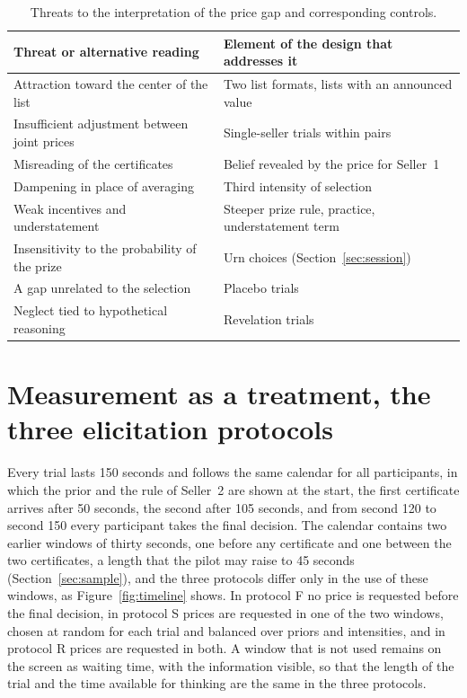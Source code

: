 \documentclass[11pt,a4paper]{article}
\newcommand{\prot}[1]{\textsf{#1}}
\begin{document}
\begin{table}[H]
\centering
\small
\begin{tabularx}{\linewidth}{@{}lL@{}}
\toprule
Threat or alternative reading & Element of the design that addresses it\\
\midrule
Attraction toward the center of the list & Two list formats, lists with an announced value\\
Insufficient adjustment between joint prices & Single-seller trials within pairs\\
Misreading of the certificates & Belief revealed by the price for Seller~1\\
Dampening in place of averaging & Third intensity of selection\\
Weak incentives and understatement & Steeper prize rule, practice, understatement term\\
Insensitivity to the probability of the prize & Urn choices (Section~\ref{sec:session})\\
A gap unrelated to the selection & Placebo trials\\
Neglect tied to hypothetical reasoning & Revelation trials\\
\bottomrule
\end{tabularx}
\caption{Threats to the interpretation of the price gap and corresponding controls.}
\label{tab:threats}
\end{table}

\section{Measurement as a treatment, the three elicitation protocols}\label{sec:protocols}

Every trial lasts 150 seconds and follows the same calendar for all participants, in which the prior and the rule of Seller~2 are shown at the start, the first certificate arrives after 50 seconds, the second after 105 seconds, and from second 120 to second 150 every participant takes the final decision. The calendar contains two earlier windows of thirty seconds, one before any certificate and one between the two certificates, a length that the pilot may raise to 45 seconds (Section~\ref{sec:sample}), and the three protocols differ only in the use of these windows, as Figure~\ref{fig:timeline} shows. In protocol \prot{F} no price is requested before the final decision, in protocol \prot{S} prices are requested in one of the two windows, chosen at random for each trial and balanced over priors and intensities, and in protocol \prot{R} prices are requested in both. A window that is not used remains on the screen as waiting time, with the information visible, so that the length of the trial and the time available for thinking are the same in the three protocols.
\end{document}
